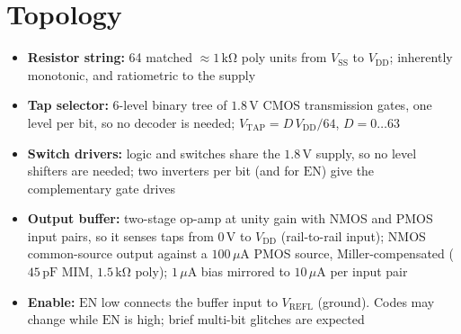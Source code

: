 \documentclass[10pt,a4paper]{article}
\newcommand{\vrefh}{\ensuremath{V_{\mathrm{REFH}}}}
\newcommand{\vrefl}{\ensuremath{V_{\mathrm{REFL}}}}
\newcommand{\vtap}{\ensuremath{V_{\mathrm{TAP}}}}
\newcommand{\vout}{\ensuremath{V_{\mathrm{OUT}}}}
\newcommand{\vdd}{\ensuremath{V_{\mathrm{DD}}}}
\newcommand{\vssa}{\ensuremath{V_{\mathrm{SS}}}}
\newcommand{\ibias}{\ensuremath{I_{\mathrm{BIAS}}}}
\newcommand{\en}{\ensuremath{\mathrm{EN}}}
\newcommand{\dbus}{\ensuremath{D_5\text{--}D_0}}
\begin{document}
\section{Topology}
\begin{itemize}
    \item \textbf{Resistor string:} 64 matched $\approx 1\,\mathrm{k\Omega}$ poly units from \vssa{} to \vdd{}; inherently monotonic, and ratiometric to the supply
    \item \textbf{Tap selector:} 6-level binary tree of $1.8\,\mathrm{V}$ CMOS transmission gates, one level per bit, so no decoder is needed; $\vtap = D\,\vdd/64$, $D = 0\ldots63$
    \item \textbf{Switch drivers:} logic and switches share the $1.8\,\mathrm{V}$ supply, so no level shifters are needed; two inverters per bit (and for \en{}) give the complementary gate drives
    \item \textbf{Output buffer:} two-stage op-amp at unity gain with NMOS and PMOS input pairs, so it senses taps from $0\,\mathrm{V}$ to \vdd{} (rail-to-rail input); NMOS common-source output against a $100\,\mu\mathrm{A}$ PMOS source, Miller-compensated ($45\,\mathrm{pF}$ MIM, $1.5\,\mathrm{k\Omega}$ poly); $1\,\mu\mathrm{A}$ bias mirrored to $10\,\mu\mathrm{A}$ per input pair
    \item \textbf{Enable:} \en{} low connects the buffer input to \vrefl{} (ground). Codes may change while \en{} is high; brief multi-bit glitches are expected
\end{itemize}

\begin{figure}[H]
\centering
{}
\end{figure}
\end{document}
